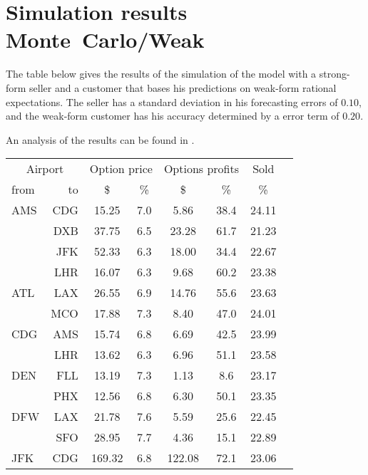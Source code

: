 \chapter{Simulation results Monte~Carlo/Weak}
\label{app:SimulationResultsMonteCarloWeak}
The table below gives the results of the simulation of the model with a strong-form seller and a customer that bases his predictions on weak-form rational expectations. The seller has a standard deviation in his forecasting errors of $0.10$, and the weak-form customer has his accuracy determined by a error term of $0.20$.

An analysis of the results can be found in .
\\[2em]
\begin{table}[h]
    \small
    \begin{center}
        \begin{tabular}{l r c c c c c c}
            \toprule
            \multicolumn{2}{c}{Airport}  & \multicolumn{2}{c}{Option price} & \multicolumn{2}{c}{Options profits}  &  Sold  \\[.4ex]
            from  &  to  &  \$  & \%  &  \$  & \%  & \%  \\
            \midrule
AMS  &  CDG &  15.25  &    7.0  &   5.86  &   38.4  &  24.11  \\
     &  DXB &  37.75  &    6.5  &  23.28  &   61.7  &  21.23  \\
     &  JFK &  52.33  &    6.3  &  18.00  &   34.4  &  22.67  \\
     &  LHR &  16.07  &    6.3  &   9.68  &   60.2  &  23.38  \\[.5ex]
ATL  &  LAX &  26.55  &    6.9  &  14.76  &   55.6  &  23.63  \\
     &  MCO &  17.88  &    7.3  &   8.40  &   47.0  &  24.01  \\[.5ex]
CDG  &  AMS &  15.74  &    6.8  &   6.69  &   42.5  &  23.99  \\
     &  LHR &  13.62  &    6.3  &   6.96  &   51.1  &  23.58  \\[.5ex]
DEN  &  FLL &  13.19  &    7.3  &   1.13  &    8.6  &  23.17  \\
     &  PHX &  12.56  &    6.8  &   6.30  &   50.1  &  23.35  \\[.5ex]
DFW  &  LAX &  21.78  &    7.6  &   5.59  &   25.6  &  22.45  \\
     &  SFO &  28.95  &    7.7  &   4.36  &   15.1  &  22.89  \\[.5ex]
JFK  &  CDG &  169.32  &    6.8  &  122.08  &   72.1  &  23.06  \\

\end{tabular}
\end{center}
\end{table}
